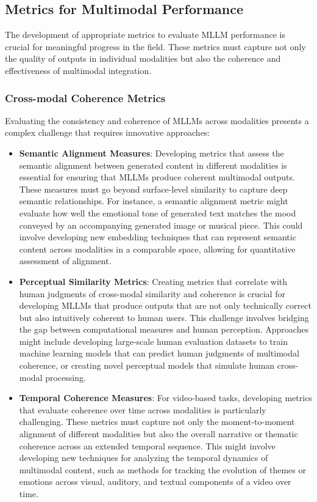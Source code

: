 \subsection{Metrics for Multimodal Performance}
The development of appropriate metrics to evaluate MLLM performance is crucial for meaningful progress in the field. These metrics must capture not only the quality of outputs in individual modalities but also the coherence and effectiveness of multimodal integration.

\subsubsection{Cross-modal Coherence Metrics}
Evaluating the consistency and coherence of MLLMs across modalities presents a complex challenge that requires innovative approaches:

\begin{itemize}
    \item \textbf{Semantic Alignment Measures}: Developing metrics that assess the semantic alignment between generated content in different modalities is essential for ensuring that MLLMs produce coherent multimodal outputs. These measures must go beyond surface-level similarity to capture deep semantic relationships. For instance, a semantic alignment metric might evaluate how well the emotional tone of generated text matches the mood conveyed by an accompanying generated image or musical piece. This could involve developing new embedding techniques that can represent semantic content across modalities in a comparable space, allowing for quantitative assessment of alignment.

    \item \textbf{Perceptual Similarity Metrics}: Creating metrics that correlate with human judgments of cross-modal similarity and coherence is crucial for developing MLLMs that produce outputs that are not only technically correct but also intuitively coherent to human users. This challenge involves bridging the gap between computational measures and human perception. Approaches might include developing large-scale human evaluation datasets to train machine learning models that can predict human judgments of multimodal coherence, or creating novel perceptual models that simulate human cross-modal processing.

    \item \textbf{Temporal Coherence Measures}: For video-based tasks, developing metrics that evaluate coherence over time across modalities is particularly challenging. These metrics must capture not only the moment-to-moment alignment of different modalities but also the overall narrative or thematic coherence across an extended temporal sequence. This might involve developing new techniques for analyzing the temporal dynamics of multimodal content, such as methods for tracking the evolution of themes or emotions across visual, auditory, and textual components of a video over time.
\end{itemize}

